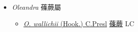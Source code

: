 
  \begin{itemize}
 \item[] \textit{Oleandra} 蓧蕨屬
                    
  \begin{itemize}
        \item[] \href{http://www.theplantlist.org/tpl1.1/search?q=Oleandra+wallichii}{\textit{O. wallichii} (Hook.) C.Presl}   \href{\detokenize{http://taibnet.sinica.edu.tw/chi/taibnet_species_list.php?T2=蓧蕨&T2_new_value=true&fr=y}}{蓧蕨} LC
  \end{itemize}
  \end{itemize}
